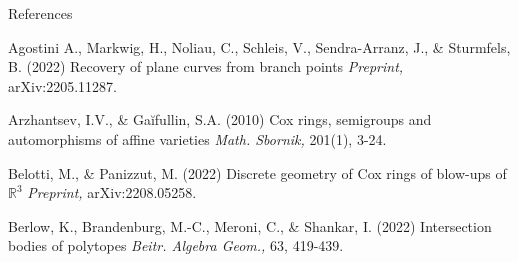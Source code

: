 \documentclass[aspectratio=169,xcolor=dvipsnames]{beamer}
\begin{document}
\begin{frame}{References}
    \footnotesize{
        \begin{thebibliography}{99}
             Agostini A., Markwig, H., Noliau, C., Schleis, V., Sendra-Arranz, J., \& Sturmfels, B. (2022)
            \newblock Recovery of plane curves from branch points
            \newblock \emph{Preprint,} arXiv:2205.11287.
        \end{thebibliography}
        \begin{thebibliography}{99}
             Arzhantsev, I.V., \& Gaĭfullin, S.A. (2010)
            \newblock Cox rings, semigroups and automorphisms of affine varieties
            \newblock \emph{Math. Sbornik,} 201(1), 3-24.
        \end{thebibliography}
        \begin{thebibliography}{99}
             Belotti, M., \& Panizzut, M. (2022)
            \newblock Discrete geometry of Cox rings of blow-ups of $\mathbb{R}^3$
            \newblock \emph{Preprint,} arXiv:2208.05258.
        \end{thebibliography}
        \begin{thebibliography}{99}
             Berlow, K., Brandenburg, M.-C., Meroni, C., \& Shankar, I. (2022)
            \newblock  Intersection bodies of polytopes
            \newblock \emph{Beitr. Algebra Geom.,} 63, 419-439.
        \end{thebibliography}
    }
\end{frame}
\end{document}
